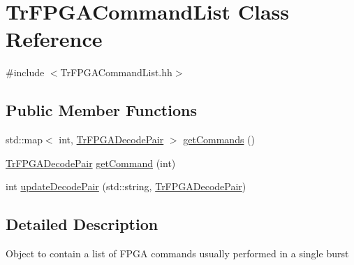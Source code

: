 \hypertarget{classTrFPGACommandList}{\section{Tr\-F\-P\-G\-A\-Command\-List Class Reference}
\label{classTrFPGACommandList}
}


{\ttfamily \#include $<$Tr\-F\-P\-G\-A\-Command\-List.\-hh$>$}

\subsection*{Public Member Functions}
\begin{DoxyCompactItemize}
\item 
std\-::map$<$ int, \hyperlink{classTrFPGADecodePair}{Tr\-F\-P\-G\-A\-Decode\-Pair} $>$ \hyperlink{classTrFPGACommandList_a1c32a9667dbed57eb5a1d510b685534b}{get\-Commands} ()
\item 
\hyperlink{classTrFPGADecodePair}{Tr\-F\-P\-G\-A\-Decode\-Pair} \hyperlink{classTrFPGACommandList_a4a898d25a2ee46209ace9f55574d115b}{get\-Command} (int)
\item 
int \hyperlink{classTrFPGACommandList_ae7a6364ad3319642f421e10692e9feeb}{update\-Decode\-Pair} (std\-::string, \hyperlink{classTrFPGADecodePair}{Tr\-F\-P\-G\-A\-Decode\-Pair})
\end{DoxyCompactItemize}


\subsection{Detailed Description}
Object to contain a list of F\-P\-G\-A commands usually performed in a single burst 

